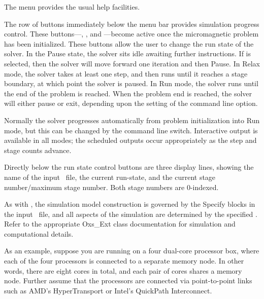 The  menu provides the usual help facilities.

The row of buttons immediately below the menu bar provides simulation
progress control.  These buttons---, ,  and
---become active once the micromagnetic problem has been
initialized. These buttons allow the user to change the run state of the
solver.  In the Pause state, the solver sits idle awaiting further
instructions.  If  is selected, then the solver will move
forward one iteration and then Pause.  In Relax mode, the solver takes
at least one step, and then runs until it reaches a stage boundary, at
which point the solver is paused.  In Run mode, the solver runs until
the end of the problem is reached.  When the problem end is reached, the
solver will either pause or exit, depending upon the setting of the
 command line option.

Normally the solver progresses automatically from problem initialization
into Run mode, but this can be changed by the  command line
switch.  Interactive output is available in all modes; the scheduled
outputs occur appropriately as the step and stage counts advance.

Directly below the run state control buttons are three display lines,
showing the name of the input \MIF\ file, the current run-state, and the
current stage number/maximum stage number.  Both stage numbers are
0-indexed.

As with , the simulation model construction is governed by
the Specify blocks in the input \MIF\ file, and all aspects of the
simulation are determined by the specified
.
Refer to the appropriate Oxs\_Ext class documentation for simulation and
computational details.

As an example, suppose you are running on a four dual-core processor
box, where each of the four processors is connected to a separate memory
node.  In other words, there are eight cores in total, and each pair of
cores shares a memory node.  Further assume that the processors are
connected via point-to-point links such as AMD's HyperTransport or
Intel's QuickPath Interconnect.

